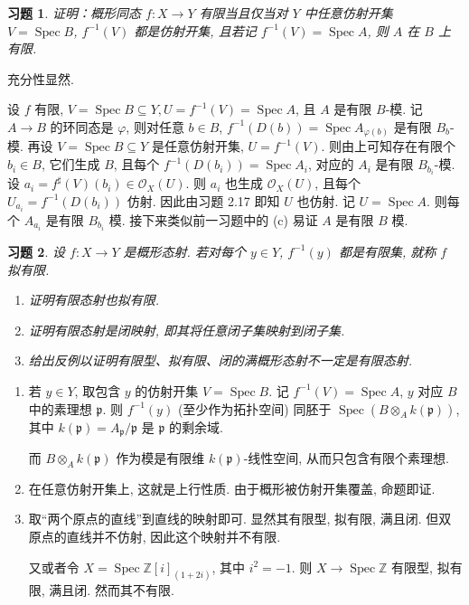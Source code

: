 \documentclass{article}
\theoremstyle{exercise}
\newtheorem{exercise}{习题}[section]
\newenvironment{proofc}{\proof}{\endproof}
\def\gp{\mathfrak{p}}
\def\Z{\mathbb{Z}}
\def\sO{\mathcal{O}}
\def\Spec{\operatorname{Spec}}
\begin{document}
\begin{exercise}
  证明：概形同态 $f \colon X \to Y$ 有限当且仅当对 $Y$ 中\emph{任意}仿射开集 $V = \Spec B$,
  $f^{-1}(V)$ 都是仿射开集, 且若记 $f^{-1}(V) = \Spec A$, 则 $A$ 在 $B$ 上有限.
\end{exercise}

\begin{proofc}
  充分性显然.

  设 $f$ 有限, $V = \Spec B \subseteq Y, U = f^{-1}(V) = \Spec A$,
  且 $A$ 是有限 $B$-模. 记 $A \to B$ 的环同态是 $\varphi$,
  则对任意 $b \in B$, $f^{-1}(D(b)) = \Spec A_{\varphi(b)}$ 是有限 $B_b$-模.
  再设 $V = \Spec B \subseteq Y$ 是任意仿射开集, $U = f^{-1}(V)$.
  则由上可知存在有限个 $b_i \in B$, 它们生成 $B$,
  且每个 $f^{-1}(D(b_i)) = \Spec A_i$, 对应的 $A_i$ 是有限 $B_{b_i}$-模.
  设 $a_i = f^\sharp(V)(b_i) \in \sO_X(U)$.
  则 $a_i$ 也生成 $\sO_X(U)$, 且每个 $U_{a_i} = f^{-1}(D(b_i))$ 仿射.
  因此由习题 2.17 即知 $U$ 也仿射. 记 $U = \Spec A$.
  则每个 $A_{a_i}$ 是有限 $B_{b_i}$ 模.
  接下来类似前一习题中的 (c) 易证 $A$ 是有限 $B$ 模.
\end{proofc}

\begin{exercise}
  设 $f \colon X \to Y$ 是概形态射. 若对每个 $y \in Y$, $f^{-1}(y)$ 都是有限集,
  就称 $f$ \emph{拟有限}.
  \begin{enumerate}[label={(\alph*)}]
    \item 证明有限态射也拟有限.
    \item 证明有限态射是\emph{闭映射}, 即其将任意闭子集映射到闭子集.
    \item 给出反例以证明有限型、拟有限、闭的满概形态射不一定是有限态射.
  \end{enumerate}
\end{exercise}

\begin{proofc}
  \begin{enumerate}[label={(\alph*)}]
    \item 若 $y \in Y$, 取包含 $y$ 的仿射开集 $V = \Spec B$.
          记 $f^{-1}(V) = \Spec A$, $y$ 对应 $B$ 中的素理想 $\gp$.
          则 $f^{-1}(y)$ (至少作为拓扑空间) 同胚于 $\Spec (B \otimes_A k(\gp))$,
          其中 $k(\gp) = A_{\gp} / \gp$ 是 $\gp$ 的剩余域.

          而 $B \otimes_A k(\gp)$ 作为模是有限维 $k(\gp)$-线性空间, 从而只包含有限个素理想.
    \item 在任意仿射开集上, 这就是上行性质. 由于概形被仿射开集覆盖, 命题即证. %
    \item 取“两个原点的直线”到直线的映射即可. 显然其有限型, 拟有限, 满且闭. %
          但双原点的直线并不仿射, 因此这个映射并不有限.

          又或者令 $X = \Spec \Z[i]_{(1+2i)}$, 其中 $i^2 = -1$.
          则 $X \to \Spec \Z$ 有限型, 拟有限, 满且闭. 然而其不有限.
          \qedhere
  \end{enumerate}
\end{proofc}
\end{document}
